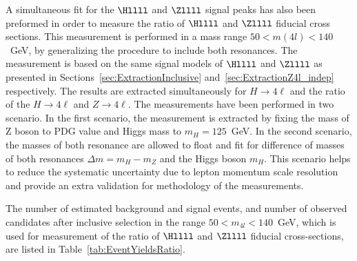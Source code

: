 A simultaneous fit for the $\Hllll$ and $\Zllll$ signal peaks has also been preformed in order to measure the ratio of $\Hllll$ and $\Zllll$ fiducial
cross sections. This measurement is performed in a mass range $50 < m(4l) < 140$~GeV, by generalizing the procedure to include both resonances. The measurement
is based on the same signal models of $\Hllll$ and $\Zllll$ as presented in Sections~\ref{sec:ExtractionInclusive} and~\ref{sec:ExtractionZ4l_indep} 
respectively. The results are extracted simultaneously for $H\rightarrow4\ell$ and the ratio of the  $H\rightarrow4\ell$ and $Z\rightarrow4\ell$. The measurements
have been performed in two scenario. In the first scenario, the measurement is extracted by fixing the mass of Z boson to PDG value and Higgs mass
to $m_H = 125$~GeV. In the second  scenario,  the masses of both resonance are allowed to float and fit for difference of masses of both resonances
$\Delta m = m_H - m_Z$ and the Higgs boson $m_H$. This scenario helps to reduce the systematic uncertainty due to lepton momentum scale resolution and provide
an extra validation for methodology of the measurements.
\par 
The number of estimated background and signal events, and number of observed candidates after inclusive selection
in the range $50 < m_{4l} < 140$~GeV, which is used for measurement of the ratio of $\Hllll$ and $\Zllll$ fiducial cross-sections, are listed
in Table~\ref{tab:EventYieldsRatio}.


